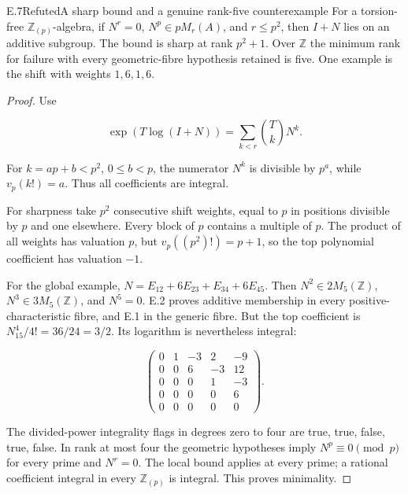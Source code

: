 \begin{statement}{E.7}{Refuted}{A sharp bound and a genuine rank-five counterexample}
For a torsion-free $\mathbb Z_{(p)}$-algebra, if $N^r=0$,
$N^p\in pM_r(A)$, and $r\le p^2$, then $I+N$ lies on
an additive subgroup. The bound is sharp at rank $p^2+1$.
Over $\mathbb Z$ the minimum rank for failure with every
geometric-fibre hypothesis retained is five.
One example is the shift with weights $1,6,1,6$.
\end{statement}
\begin{proof}
Use

$$
\exp(T\log(I+N))=\sum_{k<r}\binom TkN^k.
$$

For $k=ap+b<p^2$, $0\le b<p$, the numerator $N^k$
is divisible by $p^a$, while $v_p(k!)=a$.
Thus all coefficients are integral.

For sharpness take $p^2$ consecutive shift weights,
equal to $p$ in positions divisible by $p$ and one elsewhere.
Every block of $p$ contains a multiple of $p$.
The product of all weights has valuation $p$, but
$v_p((p^2)!)=p+1$, so the top polynomial coefficient
has valuation $-1$.

For the global example,
$N=E_{12}+6E_{23}+E_{34}+6E_{45}$.
Then $N^2\in2M_5(\mathbb Z)$, $N^3\in3M_5(\mathbb Z)$,
and $N^5=0$. E.2 proves additive membership in every
positive-characteristic fibre, and E.1 in the generic fibre.
But the top coefficient is $N^4_{15}/4!=36/24=3/2$.
Its logarithm is nevertheless integral:

$$
\begin{pmatrix}
0&1&-3&2&-9\\0&0&6&-3&12\\0&0&0&1&-3\\
0&0&0&0&6\\0&0&0&0&0
\end{pmatrix}.
$$

The divided-power integrality flags in degrees zero to
four are true, true, false, true, false.
In rank at most four the geometric hypotheses imply
$N^p\equiv0\pmod p$ for every prime and $N^r=0$.
The local bound applies at every prime; a rational
coefficient integral in every $\mathbb Z_{(p)}$ is integral.
This proves minimality.
\end{proof}

